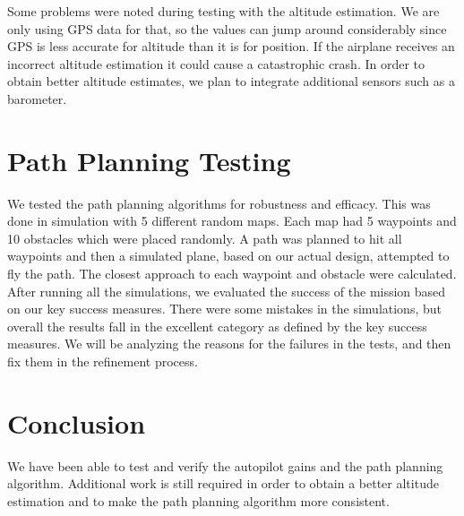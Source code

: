 \documentclass[]{auvsi_doc}
\begin{document}
Some problems were noted during testing with the altitude estimation. We are only using GPS data for that, so the values can jump around considerably since GPS is less accurate for altitude than it is for position. If the airplane receives an incorrect altitude estimation it could cause a catastrophic crash. In order to obtain better altitude estimates, we plan to integrate additional sensors such as a barometer. 

\section{Path Planning Testing}

We tested the path planning algorithms for robustness and efficacy. This was done in simulation with 5 different random maps. Each map had 5 waypoints and 10 obstacles which were placed randomly. A path was planned to hit all waypoints and then a simulated plane, based on our actual design, attempted to fly the path. The closest approach to each waypoint and obstacle were calculated. After running all the simulations, we evaluated the success of the mission based on our key success measures. There were some mistakes in the simulations, but overall the results fall in the excellent category as defined by the key success measures. We will be analyzing the reasons for the failures in the tests, and then fix them in the refinement process.

\section{Conclusion}

We have been able to test and verify the autopilot gains and the path planning algorithm. Additional work is still required in order to obtain a better altitude estimation and to make the path planning algorithm more consistent.
\end{document}
